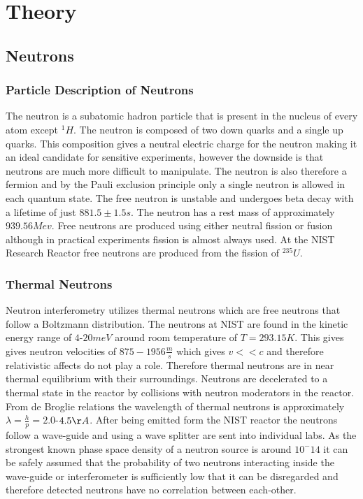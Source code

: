 
\chapter{Theory} %
\label{Chapter2}


\section{Neutrons}
\subsection{Particle Description of Neutrons}
The neutron is a subatomic hadron particle that is present in the nucleus of every atom except $^1H$. The neutron is composed of two down quarks and a single up quarks. This composition gives a neutral electric charge for the neutron making it an ideal candidate for sensitive experiments, however the downside is that neutrons are much more difficult to manipulate. The neutron is also therefore a fermion and by the Pauli exclusion principle only a single neutron is allowed in each quantum state. The free neutron is unstable and undergoes beta decay with a lifetime of just $881.5 \pm 1.5 s$. The neutron has a rest mass of approximately $939.56Mev$. Free neutrons are produced using either neutral fission or fusion although in practical experiments fission is almost always used. At the NIST Research Reactor free neutrons are produced from the fission of $^{235}U$. 
\subsection{Thermal Neutrons}
\label{sec:thermal}
Neutron interferometry utilizes thermal neutrons which are free neutrons that follow a Boltzmann distribution. The neutrons at NIST are found in the kinetic energy range of $4$-$20meV$ around room temperature of $T=293.15K$. This gives gives neutron velocities of $875-1956\frac{m}{s}$ which gives $v<<c$ and therefore relativistic affects do not play a role. Therefore thermal neutrons are in near thermal equilibrium with their surroundings. Neutrons are decelerated to a thermal state in the reactor by collisions with neutron moderators in the reactor. From de Broglie relations the wavelength of thermal neutrons is approximately $\lambda = \frac{h}{p}= 2.0$-$4.5\AA$. After being emitted form the NIST reactor the neutrons follow a wave-guide and using a wave splitter are sent into individual labs. As the strongest known phase space density of a neutron source is around $10^-14$ it can be safely assumed that the probability of two neutrons interacting inside the wave-guide or interferometer is sufficiently low that it can be disregarded and therefore detected neutrons have no correlation between each-other.

